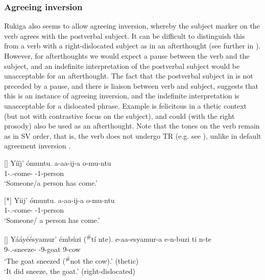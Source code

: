 \documentclass[output=paper]{langscibook}
\begin{document}
\z

\subsubsection{Agreeing inversion}

Rukiga also seems to allow agreeing inversion, whereby the subject marker on the verb agrees with the postverbal subject. It can be difficult to distinguish this from a verb with a right-dislocated subject as in an afterthought (see further in ). However, for afterthoughts we would expect a pause between the verb and the subject, and an indefinite interpretation of the postverbal subject would be unacceptable for an afterthought. The fact that the postverbal subject in  is not preceded by a pause, and there is liaison between verb and subject, suggests that this is an instance of agreeing inversion, and the indefinite interpretation is unacceptable for a dislocated phrase. Example  is felicitous in a thetic context (but not with contrastive focus on the subject), and could (with the right prosody) also be used as an afterthought. Note that the tones on the verb remain as in SV order, that is, the verb does not undergo TR (e.g. see ), unlike in default agreement inversion \citep[see][]{vanderWalAsiimwe2020}.

\ea
\label{bkm:Ref111454720}
\ea
[]{
Yííj’ ómuntu.    \jambox*{[no TR]}
\gll
a-aa-ij-a  o-mu-ntu\\
1\SM{}-\N{}.\PST{}-come-\FV{}  \AUG{}-1-person\\
\glt
‘Someone/a person has come.’\\
}

\ex
[*]{
Yiij’ ómuntu.    \jambox*{[with TR]}
\gll
a-aa-ij-a  o-mu-ntu\\
1\SM{}-\N{}.\PST{}-come-\FV{}  \AUG{}-1-person\\
\glt
‘Someone/ a person has  come.’\\
}


\z
\z

\ea
\label{bkm:Ref113453625}
\ea
[]{
\label{bkm:Ref113453625:a}
Yááyéésyamur’ émbúzi (\textsuperscript{\#}tí nte).  \jambox*{[no TR]}
\gll
e-aa-esyamur-a  e-n-buzi  ti  n-te\\
9\SM{}-\N{}.\PST{}-sneeze-\FV{}  \AUG{}-9-goat  \NEG{}  9-cow\\
\glt
‘The goat sneezed (\textsuperscript{\#}not the cow).’ (thetic)\\
‘It did sneeze, the goat.’ (right-dislocated)
}
\end{document}
